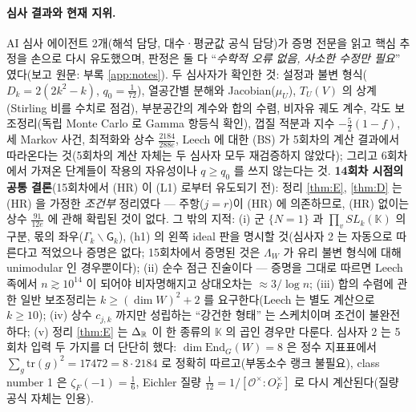 \paragraph{심사 결과와 현재 지위.} AI 심사 에이전트 2개(해석 담당, 대수·평균값 공식 담당)가 증명 전문을 읽고 핵심 추정을 손으로 다시 유도했으며, 판정은 둘 다 ``\emph{수학적 오류 없음, 사소한 수정만 필요}'' 였다(보고 원문: 부록 \ref{app:notes}). 두 심사자가 확인한 것: 설정과 불변 형식($D_k=2(2k^2-k)$, $q_0=\tfrac1{72}$), 열공간별 분해와 Jacobian($\mu_U$), $T_U(V)$ 의 상계(Stirling 비를 수치로 점검), 부분공간의 계수와 합의 수렴, 비자유 궤도 계수, 각도 보조정리(독립 Monte Carlo 로 Gamma 항등식 확인), 껍질 적분과 지수 $-\tfrac52(1-f)$, 세 Markov 사건, 최적화와 상수 $\tfrac{2184}{288e}$, Leech 에 대한 (BS) 가 5회차의 계산 결과에서 따라온다는 것(5회차의 계산 자체는 두 심사자 모두 재검증하지 않았다); 그리고 6회차에서 가져온 단계들이 작용의 자유성이나 $q\ge q_0$ 를 쓰지 않는다는 것. \textbf{14회차 시점의 공통 결론}(15회차에서 (HR) 이 (L1) 로부터 유도되기 전): 정리 \ref{thm:E}, \ref{thm:D} 는 (HR) 을 가정한 \emph{조건부} 정리였다 --- 주항($j=r$)이 (HR) 에 의존하므로, (HR) 없이는 상수 $\tfrac{91}{12e}$ 에 관해 확립된 것이 없다. 그 밖의 지적: (i) 군 $\{N=1\}$ 과 $\prod_vSL_k(\mathbb K)$ 의 구분, 몫의 좌우($\Gamma_k\backslash\mathsf G_k$), (h1) 의 왼쪽 ideal 판을 명시할 것(심사자 2 는 자동으로 따른다고 적었으나 증명은 없다; 15회차에서 증명된 것은 $\Lambda_W$ 가 유리 불변 형식에 대해 unimodular 인 경우뿐이다); (ii) 순수 점근 진술이다 --- 증명을 그대로 따르면 Leech 족에서 $n\gtrsim10^{14}$ 이 되어야 비자명해지고 상대오차는 $\approx3/\log n$; (iii) 합의 수렴에 관한 일반 보조정리는 $k\ge(\dim W)^2+2$ 를 요구한다(Leech 는 별도 계산으로 $k\ge10$); (iv) 상수 $c_{j,k}$ 까지만 성립하는 ``강건한 형태'' 는 스케치이며 조건이 불완전하다; (v) 정리 \ref{thm:E} 는 $\Delta_{\mathbb{R}}$ 이 한 종류의 $\mathbb K$ 의 곱인 경우만 다룬다. 심사자 2 는 5회차 입력 두 가지를 더 단단히 했다: $\dim\mathrm{End}_G(W)=8$ 은 정수 지표표에서 $\sum_g\mathrm{tr}(g)^2=17472=8\cdot2184$ 로 정확히 따르고(부동소수 랭크 불필요), class number 1 은 $\zeta_F(-1)=\tfrac16$, Eichler 질량 $\tfrac1{12}=1/[\mathcal O^\times:O_F^\times]$ 로 다시 계산된다(질량 공식 자체는 인용).


